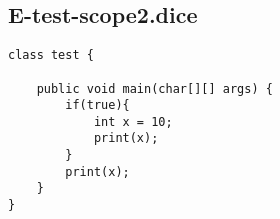 \subsection{E-test-scope2.dice}
\begin{verbatim}
class test {

	public void main(char[][] args) {
		if(true){
			int x = 10;
			print(x);
		}
		print(x);
	}
}
\end{verbatim}